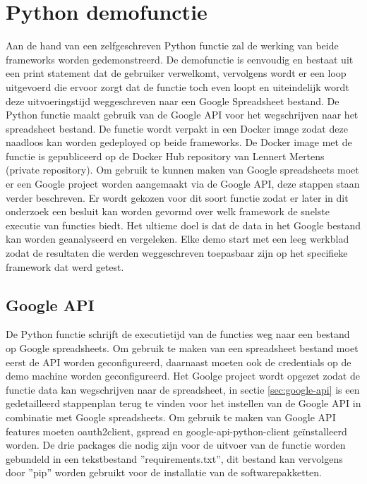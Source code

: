 \section{Python demofunctie}
\label{sec:python-demofunctie}
Aan de hand van een zelfgeschreven Python functie zal de werking van beide frameworks worden gedemonstreerd. De demofunctie is eenvoudig en bestaat uit een print statement dat de gebruiker verwelkomt, vervolgens wordt er een loop uitgevoerd die ervoor zorgt dat de functie toch even loopt en uiteindelijk wordt deze uitvoeringstijd weggeschreven naar een Google Spreadsheet bestand. De Python functie maakt gebruik van de Google API voor het wegschrijven naar het spreadsheet bestand. De functie wordt verpakt in een Docker image zodat deze naadloos kan worden gedeployed op beide frameworks. De Docker image met de functie is gepubliceerd op de Docker Hub repository van Lennert Mertens (private repository). Om gebruik te kunnen maken van Google spreadsheets moet er een Google project worden aangemaakt via de Google API, deze stappen staan verder beschreven. Er wordt gekozen voor dit soort functie zodat er later in dit onderzoek een besluit kan worden gevormd over welk framework de snelste executie van functies biedt. Het ultieme doel is dat de data in het Google bestand kan worden geanalyseerd en vergeleken. Elke demo start met een leeg werkblad zodat de resultaten die werden weggeschreven toepasbaar zijn op het specifieke framework dat werd getest.

\subsection{Google API}
De Python functie schrijft de executietijd van de functies weg naar een bestand op Google spreadsheets. Om gebruik te maken van een spreadsheet bestand moet eerst de API worden geconfigureerd, daarnaast moeten ook de credentials op de demo machine worden geconfigureerd. Het Goolge project wordt opgezet zodat de functie data kan wegschrijven naar de spreadsheet, in sectie \ref{sec:google-api} is een gedetailleerd stappenplan terug te vinden voor het instellen van de Google API in combinatie met Google spreadsheets. Om gebruik te maken van Google API features moeten oauth2client, gspread en google-api-python-client geïnstalleerd worden. De drie packages die nodig zijn voor de uitvoer van de functie worden gebundeld in een tekstbestand ''requirements.txt'', dit bestand kan vervolgens door ''pip'' worden gebruikt voor de installatie van de softwarepakketten.

